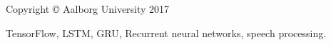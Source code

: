 \thispagestyle{empty}
{\small
\strut\vfill %
\noindent Copyright \copyright{} Aalborg University 2017\par
\vspace{0.2cm}
\noindent TensorFlow, LSTM, GRU, Recurrent neural networks, speech processing.
}
\clearpage

